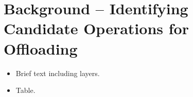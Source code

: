 \section{Background -- Identifying Candidate Operations for Offloading}
\label{sec:background}


\begin{itemize}
    \item Brief text including layers.
    \item Table.
\end{itemize}

\blindtext[3]

\newpage